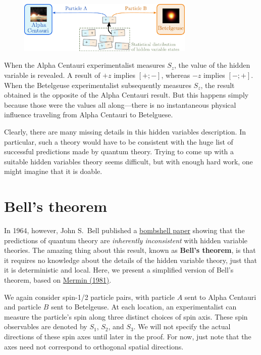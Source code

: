 \documentclass[pra,12pt]{revtex4}
\begin{document}
\begin{figure}[h]
  \centering\includegraphics[width=0.75\textwidth]{hiddenvariables}
\end{figure}

When the Alpha Centauri experimentalist measures $S_z$, the value of
the hidden variable is revealed.  A result of $+z$ implies $[+;-]$,
whereas $-z$ implies $[-;+]$.  When the Betelgeuse experimentalist
subsequently measures $S_z$, the result obtained is the opposite of
the Alpha Centauri result.  But this happens simply because those were
the values all along---there is no instantaneous physical influence
traveling from Alpha Centauri to Betelguese.

Clearly, there are many missing details in this hidden variables
description.  In particular, such a theory would have to be consistent
with the huge list of successful predictions made by quantum theory.
Trying to come up with a suitable hidden variables theory seems
difficult, but with enough hard work, one might imagine that it is
doable.

\section{Bell's theorem}

In 1964, however, John S.~Bell published a
\hyperref[cite:bell]{bombshell paper} showing that the predictions of
quantum theory are \textit{inherently inconsistent} with hidden
variable theories.  The amazing thing about this result, known as
\textbf{Bell's theorem}, is that it requires no knowledge about the
details of the hidden variable theory, just that it is deterministic
and local.  Here, we present a simplified version of Bell's theorem,
based on \hyperref[cite:mermin]{Mermin (1981)}.

We again consider spin-1/2 particle pairs, with particle $A$ sent to
Alpha Centauri and particle $B$ sent to Betelgeuse.  At each location,
an experimentalist can measure the particle's spin along three
distinct choices of spin axis.  These spin observables are denoted by
$S_1$, $S_2$, and $S_3$.  We will not specify the actual directions of
these spin axes until later in the proof.  For now, just note that the
axes need not correspond to orthogonal spatial directions.
\end{document}
